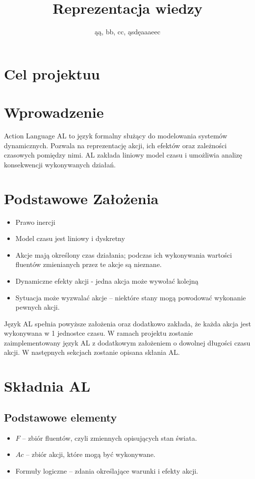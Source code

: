 \documentclass{article}
\title{Reprezentacja wiedzy}
\author{ąą, bb, cc, ąsdęaaaeec}
\begin{document}
\maketitle


\section{Cel projektuu}
\section{Wprowadzenie}
Action Language AL to język formalny służący do modelowania systemów dynamicznych. Pozwala na reprezentację akcji, ich efektów oraz zależności czasowych pomiędzy nimi. AL zakłada liniowy model czasu i umożliwia analizę konsekwencji wykonywanych działań.

\section{Podstawowe Założenia}
\begin{itemize}
    \item Prawo inercji
    \item Model czasu jest liniowy i dyskretny
    \item Akcje mają określony czas działania; podczas ich wykonywania wartości fluentów zmienianych przez te akcje są nieznane.
    \item Dynamiczne efekty akcji - jedna akcja może wywołać kolejną
    \item Sytuacja może wyzwalać akcje – niektóre stany mogą powodować wykonanie pewnych akcji.
\end{itemize}

Język AL spełnia powyższe założenia oraz dodatkowo zakłada, że każda akcja jest wykonywana w 1 jednostce czasu. W ramach projektu zostanie zaimplementowany język AL z dodatkowym założeniem o dowolnej długości czasu akcji. W następnych sekcjach zostanie opisana skłania AL.

\section{Składnia AL}

\subsection{Podstawowe elementy}
\begin{itemize}
    \item $F$ – zbiór fluentów, czyli zmiennych opisujących stan świata.
    \item $Ac$ – zbiór akcji, które mogą być wykonywane.
    \item Formuły logiczne – zdania określające warunki i efekty akcji.
\end{itemize}
\end{document}
